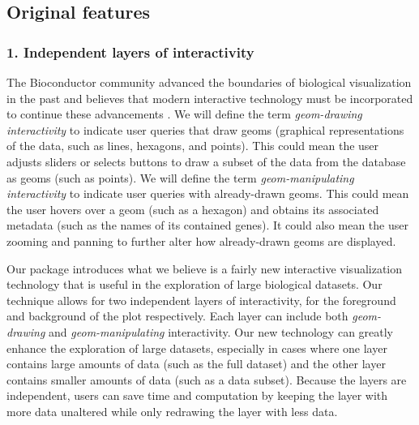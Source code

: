 \documentclass[parskip=full]{bmcart}
\begin{document}
\subsection*{Original features}

\subsubsection*{1. Independent layers of interactivity}

The Bioconductor community advanced the boundaries of biological visualization in the past and believes that modern interactive technology must be incorporated to continue these advancements \cite{gentleman2004bioconductor}. We will define the term \textit{geom-drawing interactivity} to indicate user queries that draw geoms (graphical representations of the data, such as lines, hexagons, and points). This could mean the user adjusts sliders or selects buttons to draw a subset of the data from the database as geoms (such as points). We will define the term \textit{geom-manipulating interactivity} to indicate user queries with already-drawn geoms. This could mean the user hovers over a geom (such as a hexagon) and obtains its associated metadata (such as the names of its contained genes). It could also mean the user zooming and panning to further alter how already-drawn geoms are displayed.

Our package introduces what we believe is a fairly new interactive visualization technology that is useful in the exploration of large biological datasets. Our technique allows for two independent layers of interactivity, for the foreground and background of the plot respectively. Each layer can include both \textit{geom-drawing} and \textit{geom-manipulating} interactivity. Our new technology can greatly enhance the exploration of large datasets, especially in cases where one layer contains large amounts of data (such as the full dataset) and the other layer contains smaller amounts of data (such as a data subset). Because the layers are independent, users can save time and computation by keeping the layer with more data unaltered while only redrawing the layer with less data.
\end{document}
